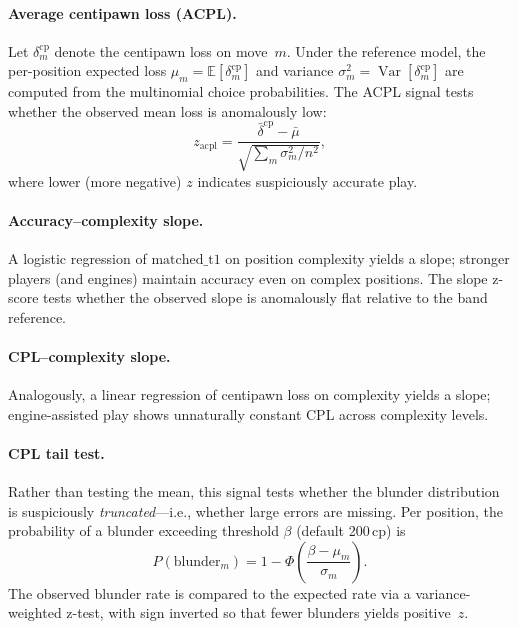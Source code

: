 \documentclass[11pt,a4paper]{article}
\DeclareMathOperator{\Var}{Var}
\theoremstyle{definition}
\begin{document}
\paragraph{Average centipawn loss (ACPL).}
Let $\delta_m^{\mathrm{cp}}$ denote the centipawn loss on move~$m$.
Under the reference model, the per-position expected loss
$\mu_m = \mathbb{E}[\delta^{\mathrm{cp}}_m]$ and variance
$\sigma_m^2 = \Var[\delta^{\mathrm{cp}}_m]$ are computed from the
multinomial choice probabilities.  The ACPL signal tests whether the
observed mean loss is anomalously low:
\begin{equation}
  \label{eq:acplz}
  z_{\mathrm{acpl}}
  = \frac{\bar{\delta}^{\mathrm{cp}} - \bar{\mu}}
         {\sqrt{\sum_m \sigma_m^2 / n^2}},
\end{equation}
where lower (more negative) $z$ indicates suspiciously accurate play.

\paragraph{Accuracy--complexity slope.}
A logistic regression of $\mathrm{matched\_t1}$ on position complexity
yields a slope; stronger players (and engines) maintain accuracy even on
complex positions.  The slope z-score tests whether the observed slope
is anomalously flat relative to the band reference.

\paragraph{CPL--complexity slope.}
Analogously, a linear regression of centipawn loss on complexity yields
a slope; engine-assisted play shows unnaturally constant CPL across
complexity levels.

\paragraph{CPL tail test.}
Rather than testing the mean, this signal tests whether the blunder
distribution is suspiciously \emph{truncated}---i.e., whether large
errors are missing.  Per position, the probability of a blunder
exceeding threshold $\beta$ (default 200\,cp) is
\begin{equation}
  P(\text{blunder}_m) = 1 - \Phi\!\left(\frac{\beta - \mu_m}{\sigma_m}\right).
\end{equation}
The observed blunder rate is compared to the expected rate via a
variance-weighted z-test, with sign inverted so that fewer blunders
yields positive~$z$.
\end{document}
